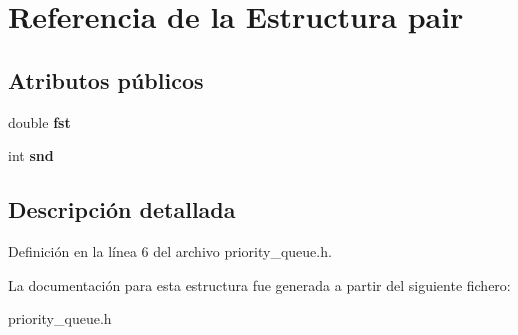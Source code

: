 \hypertarget{structpair}{}\section{Referencia de la Estructura pair}
\label{structpair}
\subsection*{Atributos públicos}
\begin{DoxyCompactItemize}
\item 
\mbox{\label{structpair_abf4746f797763b37875a8fde7db23d68}} 
double {\bfseries fst}
\item 
\mbox{\label{structpair_aedbe943584b9537b36b39597bbc38278}} 
int {\bfseries snd}
\end{DoxyCompactItemize}


\subsection{Descripción detallada}


Definición en la línea 6 del archivo priority\+\_\+queue.\+h.



La documentación para esta estructura fue generada a partir del siguiente fichero\+:\begin{DoxyCompactItemize}
\item 
priority\+\_\+queue.\+h\end{DoxyCompactItemize}
